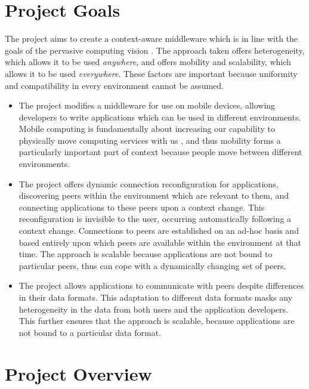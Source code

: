 \documentclass[12pt,twoside,notitlepage]{report}
\begin{document}
\section{Project Goals}

The project aims to create a context-aware middleware which is in line with the goals of the pervasive computing vision \cite{weiser1991computer}. 
The approach taken offers heterogeneity, which allows it to be used {\sl anywhere}, and offers mobility and scalability, which allows it to be used {\sl everywhere}. 
These factors are important because uniformity and compatibility in every environment cannot be assumed. 

\begin{itemize}

\item
The project modifies a middleware for use on mobile devices, allowing developers to write applications which can be used in different environments. 
Mobile computing is fundamentally about increasing our capability to physically move computing services with us \cite{lyytinen2002ubiquitous}, and thus mobility forms a particularly important part of context because people move between different environments. 

\item
The project offers dynamic connection reconfiguration for applications, discovering peers within the environment which are relevant to them, and connecting applications to these peers upon a context change. 
This reconfiguration is invisible to the user, occurring automatically following a context change. 
Connections to peers are established on an ad-hoc basis and based entirely upon which peers are available within the environment at that time. 
The approach is scalable because applications are not bound to particular peers, thus can cope with a dynamically changing set of peers. 

\item
The project allows applications to communicate with peers despite differences in their data formats. 
This adaptation to different data formats masks any heterogeneity in the data \cite{saha2003pervasive} from both users and the application developers. 
This further ensures that the approach is scalable, because applications are not bound to a particular data format. 

\end{itemize}


\section{Project Overview}
\end{document}
